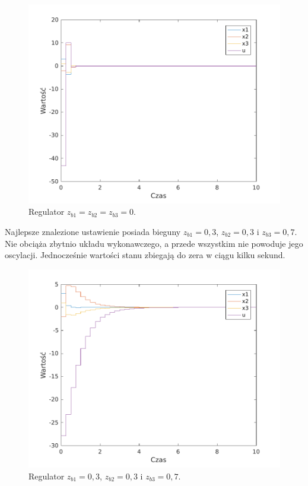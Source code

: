 \begin{figure}[H]
\centering
 \includegraphics[width=\textwidth]{img/plot6.pdf}
\caption{Regulator $z_{b1}=z_{b2}=z_{b3}=0$.}
\end{figure}

Najlepsze znalezione ustawienie posiada bieguny $z_{b1}=0,3$, $z_{b2}=0,3$ i $z_{b3}=0,7$.
Nie obciąża zbytnio układu wykonawczego, a przede wszystkim nie powoduje jego oscylacji.
Jednocześnie wartości stanu zbiegają do zera w ciągu kilku sekund.

\begin{figure}[H]
\centering
 \includegraphics[width=\textwidth]{img/plot7.pdf}
\caption{Regulator $z_{b1}=0,3$, $z_{b2}=0,3$ i $z_{b3}=0,7$.}
\end{figure}



